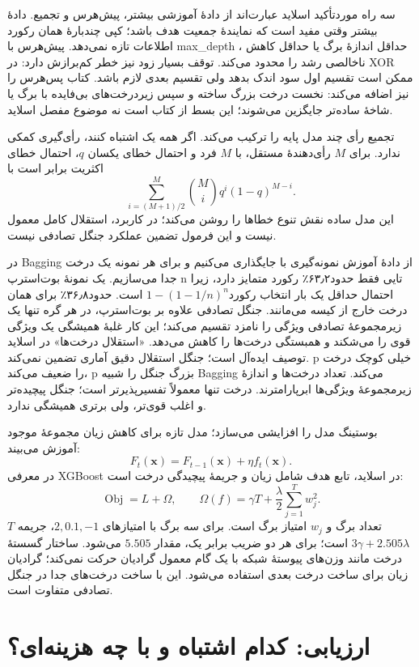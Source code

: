 سه راه موردتأکید اسلاید عبارت‌اند از دادهٔ آموزشی بیشتر، پیش‌هرس و تجمیع. دادهٔ بیشتر وقتی مفید است که نمایندهٔ جمعیت هدف باشد؛ کپی چندبارهٔ همان رکورد اطلاعات تازه نمی‌دهد. پیش‌هرس با max\_depth ، حداقل اندازهٔ برگ یا حداقل کاهش ناخالصی رشد را محدود می‌کند. توقف بسیار زود نیز خطر کم‌برازش دارد: در XOR ممکن است تقسیم اول سود اندک بدهد ولی تقسیم بعدی لازم باشد. کتاب پس‌هرس را نیز اضافه می‌کند: نخست درخت بزرگ ساخته و سپس زیر‌درخت‌های بی‌فایده با برگ یا شاخهٔ ساده‌تر جایگزین می‌شوند؛ این بسط از کتاب است نه موضوع مفصل اسلاید.

تجمیع  رأی چند مدل پایه را ترکیب می‌کند. اگر همه یک اشتباه کنند، رأی‌گیری کمکی ندارد. برای $M$ رأی‌دهندهٔ مستقل، با $M$ فرد و احتمال خطای یکسان $q$، احتمال خطای اکثریت برابر است با
\[\sum_{i=(M+1)/2}^{M}\binom Mi q^i(1-q)^{M-i}.\]
این مدل ساده نقش تنوع خطاها را روشن می‌کند؛ در کاربرد، استقلال کامل معمول نیست و این فرمول تضمین عملکرد جنگل تصادفی نیست.

در Bagging از دادهٔ آموزش نمونه‌گیری با جایگذاری می‌کنیم و برای هر نمونه یک درخت جدا می‌سازیم. یک نمونهٔ بوت‌استرپ n تایی فقط حدود۶۳٫۲٪ رکورد متمایز دارد، زیرا احتمال حداقل یک بار انتخاب رکورد$1-(1-1/n)^n$ است. حدود۳۶٫۸٪ برای همان درخت خارج از کیسه می‌مانند. جنگل تصادفی علاوه بر بوت‌استرپ، در هر گره تنها یک زیرمجموعهٔ تصادفی ویژگی را نامزد تقسیم می‌کند؛ این کار غلبهٔ همیشگی یک ویژگی قوی را می‌شکند و همبستگی درخت‌ها را کاهش می‌دهد. «استقلال درخت‌ها» در اسلاید توصیف ایده‌آل است؛ جنگل استقلال دقیق آماری تضمین نمی‌کند. p خیلی کوچک درخت را ضعیف می‌کند، p بزرگ جنگل را شبیه Bagging می‌کند. تعداد درخت‌ها و اندازهٔ زیرمجموعهٔ ویژگی‌ها ابرپارامترند. درخت تنها معمولاً تفسیرپذیرتر است؛ جنگل پیچیده‌تر و اغلب قوی‌تر، ولی برتری همیشگی ندارد.

بوستینگ مدل را افزایشی می‌سازد؛ مدل تازه برای کاهش زیان مجموعهٔ موجود آموزش می‌بیند:
\[F_t(\mathbf x)=F_{t-1}(\mathbf x)+\eta f_t(\mathbf x).\]
در معرفی XGBoost در اسلاید، تابع هدف شامل زیان و جریمهٔ پیچیدگی درخت است:
\[\operatorname{Obj}=L+\Omega,\qquad \Omega(f)=\gamma T+\frac\lambda2\sum_{j=1}^{T}w_j^2.\]
$T$ تعداد برگ و $w_j$ امتیاز برگ است. برای سه برگ با امتیازهای $2,0.1,-1$، جریمه $3\gamma+2.505\lambda$ است؛ برای هر دو ضریب برابر یک، مقدار $5.505$ می‌شود. ساختار گسستهٔ درخت مانند وزن‌های پیوستهٔ شبکه با یک گام معمول گرادیان حرکت نمی‌کند؛ گرادیان زیان برای ساخت درخت بعدی استفاده می‌شود. این با ساخت درخت‌های جدا در جنگل تصادفی متفاوت است.



\section{ارزیابی: کدام اشتباه و با چه هزینه‌ای؟}

